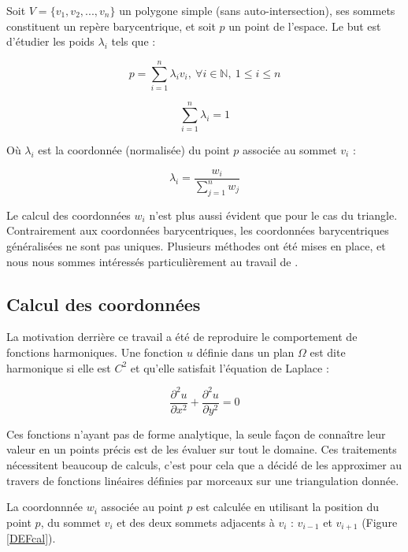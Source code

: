 Soit $V = \{v_1, v_2, ..., v_n\}$ un polygone simple (sans auto-intersection),
ses sommets constituent un repère barycentrique, et soit $p$ un point de
l'espace. Le but est d'étudier les poids $\lambda_i$ tels que :

\begin{equation}
  p = \sum_{i=1}^{n} \lambda_i v_i ,
  ~ \forall i \in \mathbb{N} ,~ 1 \leq i \leq n
\end{equation}

\begin{equation}
  \sum_{i=1}^n \lambda_i = 1
\end{equation}

Où $\lambda_i$ est la coordonnée (normalisée) du point $p$ associée au sommet
$v_i$ :

\begin{equation}
  \lambda_i = \frac{w_i}{\sum_{j=1}^n w_j}
\end{equation}

Le calcul des coordonnées $w_i$ n'est plus aussi évident que pour le cas du
triangle. Contrairement aux coordonnées barycentriques, les coordonnées
barycentriques généralisées ne sont pas uniques. Plusieurs méthodes ont été
mises en place, et nous nous sommes intéressés particulièrement au travail de
\cite{Flo03}.

\subsection{Calcul des coordonnées}

La motivation derrière ce travail a été de reproduire le comportement de
fonctions harmoniques. Une fonction $u$ définie dans un plan $\Omega$ est dite
harmonique si elle est $C^2$ et qu'elle satisfait l'équation de Laplace :

\begin{equation}
  \frac{\partial^2 u}{\partial x^2} + \frac{\partial^2 u}{\partial y^2} = 0
\end{equation}

Ces fonctions n'ayant pas de forme analytique, la seule façon de connaître leur
valeur en un points précis est de les évaluer sur tout le domaine. Ces
traitements nécessitent beaucoup de calculs, c'est pour cela que \cite{Flo03} a
décidé de les approximer au travers de fonctions linéaires définies par morceaux
sur une triangulation donnée.

La coordonnnée $w_i$ associée au point $p$ est calculée en utilisant la
position du point $p$, du sommet $v_i$ et des deux sommets adjacents à $v_i$ :
$v_{i-1}$ et $v_{i+1}$ (Figure \ref{DEFcal}).

